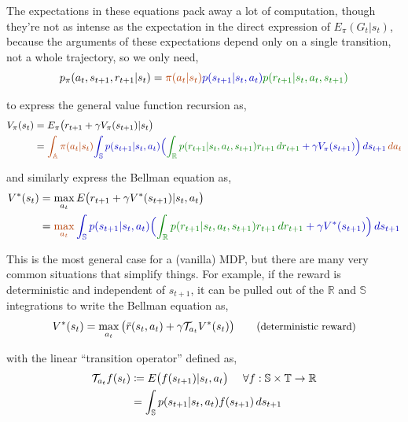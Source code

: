 The expectations in these equations pack away a lot of computation, though they're not as intense as the expectation in the direct expression of $E_\pi(G_t|s_t)$, because the arguments of these expectations depend only on a single transition, not a whole trajectory, so we only need,
\begin{equation*}
p_\pi(a_t, s_{t+1}, r_{t+1}|s_t) = \orange{\pi(a_t|s_t)} \blue{p(s_{t+1}|s_t,a_t)} \green{p(r_{t+1}|s_t,a_t,s_{t+1})}
\end{equation*}

to express the general value function recursion as,
\begin{align*}
V_\pi(s_t) &= E_\pi\big{(}r_{t+1} + \gamma V_{\pi}(s_{t+1}) | s_t\big{)}\\
&= \orange{\int_{\mathbb{A}} \pi(a_t|s_t) \blue{\int_{\mathbb{S}} p(s_{t+1}|s_t,a_t) \Big{(}\green{\int_{\mathbb{R}}p(r_{t+1}|s_t,a_t,s_{t+1}) r_{t+1} \,dr_{t+1}} + \gamma V_{\pi}(s_{t+1}) \Big{)}\,ds_{t+1}}\,da_t}
\end{align*}

and similarly express the Bellman equation as,
\begin{align*}
V^*(s_t) &= \max_{a_t} E\big{(}r_{t+1} + \gamma V^*(s_{t+1}) | s_t, a_t\big{)}\\
&= \orange{\max_{a_t} \blue{\int_{\mathbb{S}} p(s_{t+1}|s_t,a_t) \Big{(}\green{\int_{\mathbb{R}} p(r_{t+1}|s_t,a_t,s_{t+1})r_{t+1} \,dr_{t+1}} + \gamma V^*(s_{t+1}) \Big{)}\,ds_{t+1}}}
\end{align*}

This is the most general case for a (vanilla) MDP, but there are many very common situations that simplify things. For example, if the reward is deterministic and independent of $s_{t+1}$, it can be pulled out of the $\mathbb{R}$ and $\mathbb{S}$ integrations to write the Bellman equation as,
\begin{equation*}
V^*(s_t) = \max_{a_t} \big{(} \bar{r}(s_t, a_t) + \gamma \mathcal{T}_{a_t} V^*(s_t) \big{)} \tag{\small{deterministic reward}}
\end{equation*}

with the linear ``transition operator'' defined as,
\begin{align*}
\mathcal{T}_{a_t} f(s_t) &\coloneqq E\big{(}f(s_{t+1})|s_t,a_t\big{)}\ \ \ \ \forall f : \mathbb{S} \times \mathbb{T} \to \mathbb{R}\\
&= \int_{\mathbb{S}}p(s_{t+1}|s_t,a_t)f(s_{t+1})\,ds_{t+1}
\end{align*}


